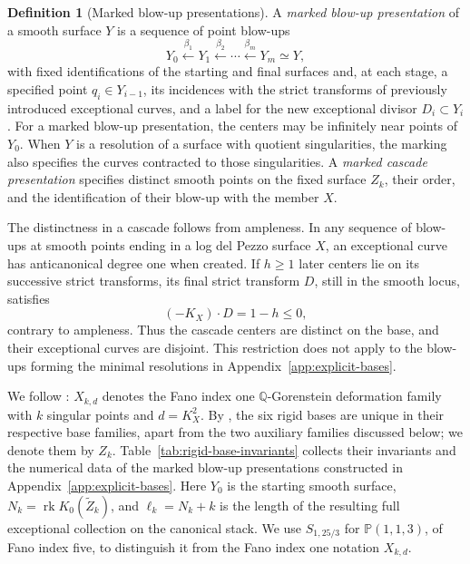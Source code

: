 \documentclass[11pt]{article}
\theoremstyle{plain}
\theoremstyle{definition}
\newtheorem{definition}[definition]{Definition}
\theoremstyle{remark}
\newcommand{\Pp}{\mathbb P}
\newcommand{\rk}{\operatorname{rk}}
\begin{document}
\begin{definition}[Marked blow-up presentations]
\label{def:marked-blowup-presentation}
A \emph{marked blow-up presentation} of a smooth surface \(Y\) is a
sequence of point blow-ups
\[
Y_0\xleftarrow{\beta_1}Y_1\xleftarrow{\beta_2}\cdots
\xleftarrow{\beta_m}Y_m\simeq Y,
\]
with fixed identifications of the starting and final surfaces and, at
each stage, a specified point \(q_i\in Y_{i-1}\), its incidences with
the strict transforms of previously introduced exceptional curves, and
a label for the new exceptional divisor \(D_i\subset Y_i\).
For a marked blow-up presentation, the centers may be infinitely
near points of \(Y_0\). When \(Y\) is a
resolution of a surface with quotient singularities, the marking also
specifies the curves contracted to those singularities. A \emph{marked
cascade presentation} specifies distinct smooth points on the fixed
surface \(Z_k\), their order, and the identification of their blow-up
with the member \(X\).
\end{definition}

The distinctness in a cascade follows from ampleness. In any sequence
of blow-ups at smooth points ending in a log del Pezzo surface \(X\),
an exceptional curve has anticanonical degree one when created. If
\(h\geq1\) later centers lie on its successive strict transforms,
its final strict transform \(D\), still in the smooth locus, satisfies
\begin{equation}\label{eq:cascade-distinct}
(-K_X)\cdot D=1-h\leq0,
\end{equation}
contrary to ampleness. Thus the cascade centers are distinct on the
base, and their exceptional curves are disjoint. This restriction does
not apply to the blow-ups forming the minimal resolutions in Appendix~\ref{app:explicit-bases}.

We follow \cite[Theorem~4]{Corti2016}: \(X_{k,d}\) denotes the Fano index
one \(\mathbb Q\)-Gorenstein deformation family with \(k\) singular points and \(d=K_X^2\).
By \cite[Theorem~6(1)--(6) and Remark~7]{Corti2016}, the six rigid bases
are unique in their respective base families, apart from the two auxiliary
families discussed below; we denote them by \(Z_k\).
Table~\ref{tab:rigid-base-invariants}
collects their invariants and the numerical data of the marked blow-up
presentations constructed in Appendix~\ref{app:explicit-bases}. Here \(Y_0\) is
the starting smooth surface, \(N_k=\rk K_0(\widetilde Z_k)\), and
\(\ell_k=N_k+k\) is the length of the resulting full exceptional collection on the canonical stack.
We use \(S_{1,25/3}\) for \(\Pp(1,1,3)\), of Fano index five, to
distinguish it from the Fano index one notation \(X_{k,d}\).
\end{document}
